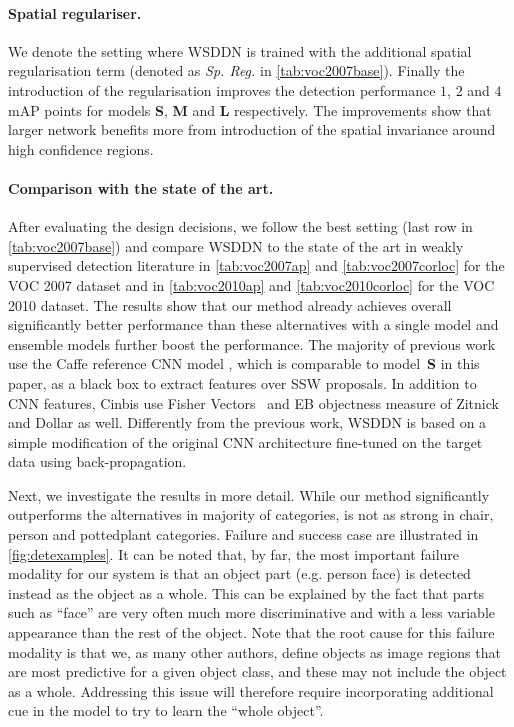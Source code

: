 \paragraph{Spatial regulariser.} We denote the setting where WSDDN is trained with the additional spatial regularisation term (denoted as \emph{Sp. Reg.} in \cref{tab:voc2007base}). Finally the introduction of the regularisation improves the detection performance $1$, $2$ and $4$ mAP points for models \textbf{S}, \textbf{M} and \textbf{L} respectively. The improvements show that larger network benefits more from introduction of the spatial invariance around high confidence regions.


\paragraph{Comparison with the state of the art.}
After evaluating the design decisions, we follow the best setting (last row in \cref{tab:voc2007base}) and compare WSDDN to the state of the art in weakly supervised detection literature in \cref{tab:voc2007ap} and \cref{tab:voc2007corloc} for the VOC 2007 dataset and in \cref{tab:voc2010ap} and \cref{tab:voc2010corloc} for the VOC 2010 dataset. The results show that our method already achieves overall significantly better performance than these alternatives with a single model and ensemble models further boost the performance. The majority of previous work \cite{Song14,Song14a,Bilen14,Wang14,Bilen15} use the Caffe reference CNN model \cite{Jia13}, which is comparable to model~\textbf{S} in this paper, as a black box to extract features over SSW proposals. In addition to CNN features, Cinbis \etal \cite{Cinbis15} use Fisher Vectors~\cite{Perronnin10a} and EB objectness measure of Zitnick and Dollar \cite{Zitnick14} as well. Differently from the previous work, WSDDN is based on a simple modification of the original CNN architecture fine-tuned on the target data using back-propagation.

Next, we investigate the results in more detail. While our method significantly outperforms the alternatives in majority of categories, is not as strong in chair, person and pottedplant categories. Failure and success case are illustrated in \cref{fig:detexamples}. It can be noted that, by far, the most important failure modality for our system is that an object part (e.g. person face) is detected instead as the object as a whole. This can be explained by the fact that parts such as ``face'' are very often much more discriminative and with a less variable appearance than the rest of the object. Note that the root cause for this failure modality is that we, as many other authors, define objects as image regions that are most predictive for a given object class, and these may not include the object as a whole. Addressing this issue will therefore require incorporating additional cue in the model to try to learn the ``whole object''.

